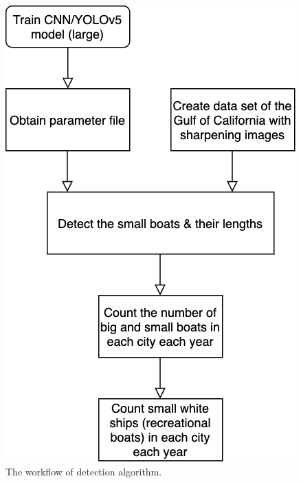 \begin{figure}[h]
    \centering
    \includegraphics[scale=0.35]{img/workflow.png}
    \caption{The workflow of detection algorithm.}
    \label{fig:workflow}
\end{figure}